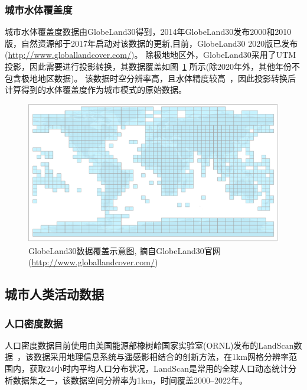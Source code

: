 \subsubsection{城市水体覆盖度}\label{城市水体覆盖度}
城市水体覆盖度数据由GlobeLand30得到，2014年GlobeLand30发布2000和2010版，自然资源部于2017年启动对该数据的更新,目前，GlobeLand30 2020版已发布 (\url{http://www.globallandcover.com/})。
除极地地区外，GlobeLand30采用了UTM投影，因此需要进行投影转换，其数据覆盖如图~\ref{fig:GlobeLand30数据覆盖示意图} 所示(除2020年外，其他年份不包含极地地区数据)。
该数据时空分辨率高，且水体精度较高~\citep{chen2015global}，因此投影转换后计算得到的水体覆盖度作为城市模式的原始数据。

{
\begin{figure}[htbp]
\centering
\includegraphics{Figures/基础数据/GlobeLand30数据覆盖示意图.png}
\captionsetup{justification=centering}
\caption[GlobeLand30数据覆盖示意图]{GlobeLand30数据覆盖示意图, 摘自GlobeLand30官网(\url{http://www.globallandcover.com/})}
\label{fig:GlobeLand30数据覆盖示意图}
\end{figure}
}


\subsection{城市人类活动数据}\label{城市人类活动数据}

\subsubsection{人口密度数据}\label{人口密度数据}
人口密度数据目前使用由美国能源部橡树岭国家实验室(ORNL)发布的LandScan数据~\citep{brightLandScanGlobal20002001}，该数据采用地理信息系统与遥感影相结合的创新方法，在1km网格分辨率范围内，获取24小时内平均人口分布状况，LandScan是常用的全球人口动态统计分析数据集之一，该数据空间分辨率为1km，时间覆盖2000--2022年。

